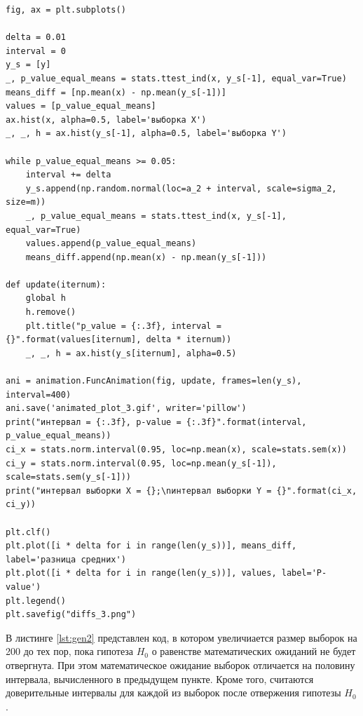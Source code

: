 \documentclass[12pt]{report}
\begin{document}
\newpage
\begin{lstlisting}[label=lst:gen1,caption=код сдвига математическое ожидание одной из выборок относительно другой]
fig, ax = plt.subplots()

delta = 0.01
interval = 0
y_s = [y]
_, p_value_equal_means = stats.ttest_ind(x, y_s[-1], equal_var=True)
means_diff = [np.mean(x) - np.mean(y_s[-1])]
values = [p_value_equal_means]
ax.hist(x, alpha=0.5, label='выборка X')
_, _, h = ax.hist(y_s[-1], alpha=0.5, label='выборка Y')

while p_value_equal_means >= 0.05:
    interval += delta
    y_s.append(np.random.normal(loc=a_2 + interval, scale=sigma_2, size=m))
    _, p_value_equal_means = stats.ttest_ind(x, y_s[-1], equal_var=True)
    values.append(p_value_equal_means)
    means_diff.append(np.mean(x) - np.mean(y_s[-1]))

def update(iternum):
    global h
    h.remove()
    plt.title("p_value = {:.3f}, interval = {}".format(values[iternum], delta * iternum))
    _, _, h = ax.hist(y_s[iternum], alpha=0.5)
    
ani = animation.FuncAnimation(fig, update, frames=len(y_s), interval=400)
ani.save('animated_plot_3.gif', writer='pillow')
print("интервал = {:.3f}, p-value = {:.3f}".format(interval, p_value_equal_means))
ci_x = stats.norm.interval(0.95, loc=np.mean(x), scale=stats.sem(x))
ci_y = stats.norm.interval(0.95, loc=np.mean(y_s[-1]), scale=stats.sem(y_s[-1]))
print("интервал выборки X = {};\nинтервал выборки Y = {}".format(ci_x, ci_y))

plt.clf()
plt.plot([i * delta for i in range(len(y_s))], means_diff, label='разница средних')
plt.plot([i * delta for i in range(len(y_s))], values, label='P-value')
plt.legend()
plt.savefig("diffs_3.png")
\end{lstlisting}


В листинге \ref{lst:gen2} представлен код, в котором увеличиается размер выборок на 200 до тех пор, пока гипотеза $H_0$ о равенстве математических ожиданий не будет отвергнута. При этом математическое ожидание выборок отличается на половину интервала, вычисленного в предыдущем пункте. Кроме того, считаются доверительные интервалы для каждой из выборок после отвержения гипотезы $H_0$.
\end{document}
